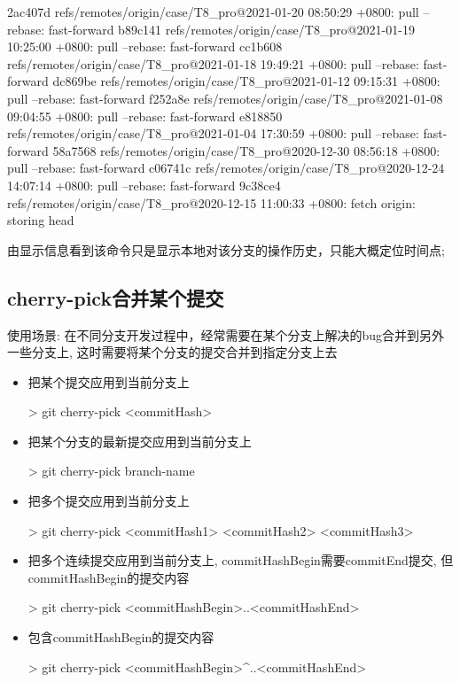\begin{messagebox}
2ac407d refs/remotes/origin/case/T8_pro@{2021-01-20 08:50:29 +0800}: pull --rebase: fast-forward
b89c141 refs/remotes/origin/case/T8_pro@{2021-01-19 10:25:00 +0800}: pull --rebase: fast-forward
cc1b608 refs/remotes/origin/case/T8_pro@{2021-01-18 19:49:21 +0800}: pull --rebase: fast-forward
dc869be refs/remotes/origin/case/T8_pro@{2021-01-12 09:15:31 +0800}: pull --rebase: fast-forward
f252a8e refs/remotes/origin/case/T8_pro@{2021-01-08 09:04:55 +0800}: pull --rebase: fast-forward
e818850 refs/remotes/origin/case/T8_pro@{2021-01-04 17:30:59 +0800}: pull --rebase: fast-forward
58a7568 refs/remotes/origin/case/T8_pro@{2020-12-30 08:56:18 +0800}: pull --rebase: fast-forward
c06741c refs/remotes/origin/case/T8_pro@{2020-12-24 14:07:14 +0800}: pull --rebase: fast-forward
9c38ce4 refs/remotes/origin/case/T8_pro@{2020-12-15 11:00:33 +0800}: fetch origin: storing head
\end{messagebox}
由显示信息看到该命令只是显示本地对该分支的操作历史，只能大概定位时间点;


\subsection{cherry-pick合并某个提交}
使用场景: 在不同分支开发过程中，经常需要在某个分支上解决的bug合并到另外一些分支上, 这时需要将某个分支的提交合并到指定分支上去
\begin{itemize}
\item 把某个提交应用到当前分支上
\begin{commandbox}
 > git cherry-pick <commitHash>
\end{commandbox}

\item 把某个分支的最新提交应用到当前分支上
\begin{commandbox}
 > git cherry-pick branch-name
\end{commandbox}

\item 把多个提交应用到当前分支上
\begin{commandbox}
 > git cherry-pick <commitHash1> <commitHash2> <commitHash3>
\end{commandbox}

\item 把多个连续提交应用到当前分支上, commitHashBegin需要commitEnd提交, 但 \newline commitHashBegin的提交内容
\begin{commandbox}
 > git cherry-pick <commitHashBegin>..<commitHashEnd>
\end{commandbox}

\item 包含commitHashBegin的提交内容
\begin{commandbox}
 > git cherry-pick <commitHashBegin>^..<commitHashEnd>
\end{commandbox}

\end{itemize}

